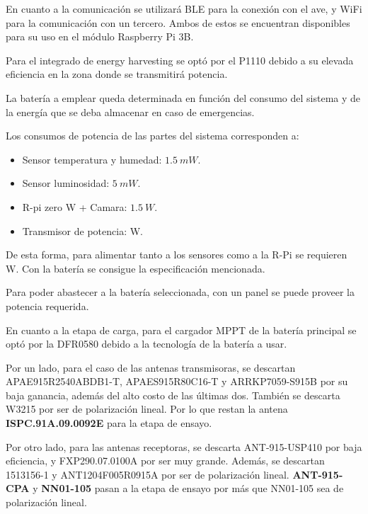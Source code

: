 
En cuanto a la comunicación se utilizará BLE para la conexión con el ave, y WiFi para la comunicación con un tercero.
Ambos de estos se encuentran disponibles para su uso en el módulo Raspberry Pi 3B.


Para el integrado de energy harvesting se optó por el P1110 debido a su elevada eficiencia en la zona donde se transmitirá potencia.


La batería a emplear queda determinada en función del consumo del sistema y de la energía que se deba almacenar en caso de emergencias. 

Los consumos de potencia de las partes del sistema corresponden a:
\begin{itemize}
	\item Sensor temperatura y humedad: $1.5 \ mW$.
	\item Sensor luminosidad: $5 \ mW$.
	\item R-pi zero W + Camara: $1.5 \ W$.
	\item Transmisor de potencia: \TBD W.
\end{itemize}

De esta forma, para alimentar tanto a los sensores como a la R-Pi se requieren \TBD W. Con la batería \TBD se consigue la especificación mencionada.


Para poder abastecer a la batería seleccionada, con un panel \TBD se puede proveer la potencia requerida.

En cuanto a la etapa de carga, para el cargador MPPT de la batería principal se optó por la DFR0580  debido a la tecnología de la batería a usar.

Por un lado, para el caso de las antenas transmisoras, se descartan APAE915R2540ABDB1-T, APAES915R80C16-T y ARRKP7059-S915B por su baja ganancia, además del alto costo de las últimas dos. También se descarta W3215 por ser de polarización lineal. Por lo que restan la antena \textbf{ISPC.91A.09.0092E} para la etapa de ensayo.

Por otro lado, para las antenas receptoras, se descarta ANT-915-USP410 por baja eficiencia, y FXP290.07.0100A por ser muy grande. Además, se descartan 1513156-1 y ANT1204F005R0915A por ser de polarización lineal. \textbf{ANT-915-CPA} y \textbf{NN01-105} pasan a la etapa de ensayo por más que NN01-105 sea de polarización lineal.

